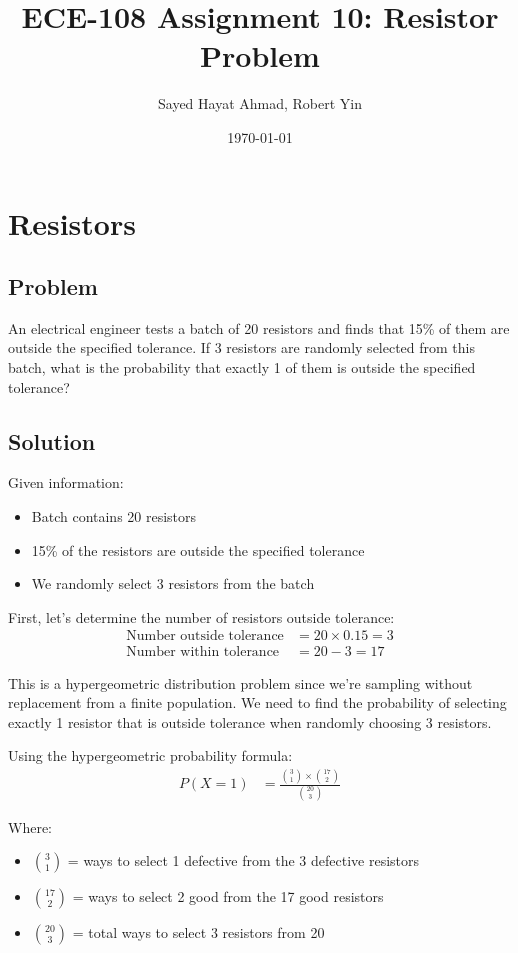 \documentclass{article}
\title{ECE-108 Assignment 10: Resistor Problem}
\author{Sayed Hayat Ahmad, Robert Yin}
\date{\today}
\begin{document}
\maketitle

\section{Resistors}

\subsection*{Problem}

An electrical engineer tests a batch of 20 resistors and finds that 15\% of them are outside the specified tolerance. If 3 resistors are randomly selected from this batch, what is the probability that exactly 1 of them is outside the specified tolerance?

\subsection*{Solution}

Given information:
\begin{itemize}
    \item Batch contains 20 resistors
    \item 15\% of the resistors are outside the specified tolerance
    \item We randomly select 3 resistors from the batch
\end{itemize}

First, let's determine the number of resistors outside tolerance:
\begin{align}
\text{Number outside tolerance} &= 20 \times 0.15 = 3\\
\text{Number within tolerance} &= 20 - 3 = 17
\end{align}

This is a hypergeometric distribution problem since we're sampling without replacement from a finite population. We need to find the probability of selecting exactly 1 resistor that is outside tolerance when randomly choosing 3 resistors.

Using the hypergeometric probability formula:
\begin{align}
P(X = 1) &= \frac{\binom{3}{1} \times \binom{17}{2}}{\binom{20}{3}}
\end{align}

Where:
\begin{itemize}
    \item $\binom{3}{1}$ = ways to select 1 defective from the 3 defective resistors
    \item $\binom{17}{2}$ = ways to select 2 good from the 17 good resistors
    \item $\binom{20}{3}$ = total ways to select 3 resistors from 20
\end{itemize}
\end{document}
